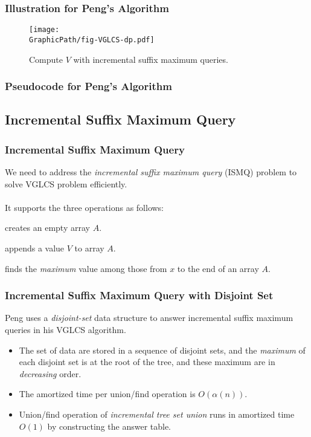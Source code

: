 \begin{frame}
    \frametitle{Illustration for Peng's Algorithm}
    \begin{figure}[!thb]
		\texttt{[image: \\GraphicPath/fig-VGLCS-dp.pdf]}
		\caption{Compute $V$ with incremental suffix maximum queries.}
	\end{figure}
\end{frame}

\begin{withoutheadline}
\begin{frame}
	\frametitle{Pseudocode for Peng's Algorithm}
	\begin{center}
		\scalebox{.7} { \begin{minipage}{1.2\textwidth}
			
			\end{minipage}
		}
	\end{center}
\end{frame}
\end{withoutheadline}

\subsection{Incremental Suffix Maximum Query}
\begin{frame}
    \frametitle{Incremental Suffix Maximum Query}

    We need to address the {\em incremental suffix maximum query} (ISMQ)
    problem to solve VGLCS problem efficiently.
    \\~\\
    It supports the three operations as follows:
    \begin{description}[align=right]
    	\setlength\itemsep{1em}
    	\item[{\sc Make}]
			creates an empty array $A$.
		\item[{\sc Append}$(V)$]
			appends a value $V$ to array $A$. 
		\item[{\sc Query}$(x)$]
			finds the {\em maximum} value among those from $x$ to the
			end of an array $A$.
    \end{description}
\end{frame}

\begin{frame}
    \frametitle{Incremental Suffix Maximum Query with Disjoint Set}

    Peng uses a {\em disjoint-set} data structure to answer incremental
	suffix maximum queries in his VGLCS algorithm.

	\begin{itemize}
		\setlength\itemsep{1em}
		\item 
			The set of data are stored in a sequence of disjoint sets,
			and the {\em maximum} of each disjoint set is at the root of
			the tree, and these maximum are in {\em decreasing} order.
		\item
			The amortized time per union/find operation is
			$O(\alpha(n))$.
		\item
			Union/find operation of {\em incremental tree set union}
			runs in amortized time $O(1)$ by constructing the answer
			table.
	\end{itemize}
\end{frame}

